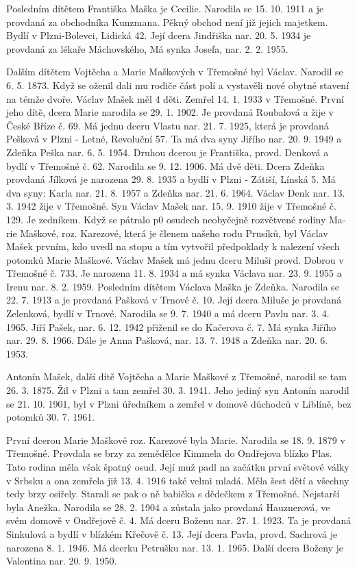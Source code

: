 \documentclass[../dejiny-rodu-prusiku.tex]{subfiles}
\begin{document}
Posledním dítětem Františka Maška je Cecilie. Narodila se 15. 10. 1911 a je provdaná za obchodníka Kunzmana. Pěkný obchod není již jejich majetkem. Bydlí v Plzni-Bolevci, Lidická 42. Její dcera Jindřiška nar. 20. 5. 1934 je provdaná za lékaře Máchovského, Má synka Josefa, nar. 2. 2. 1955.

Dalším dítětem Vojtěcha a Marie Maškových v Třemošné byl Václav. Narodil se 6. 5.  1873. Když se oženil dali mu rodiče část polí a vystavěli nové obytné stavení na témže dvoře. Václav Mašek měl 4 děti. Zemřel 14. 1. 1933 v Třemošné. První jeho dítě, dcera Marie narodila se 29. 1. 1902. Je provdaná Roubalová a žije v České Bříze  č. 69. Má jednu dceru Vlastu nar. 21. 7. 1925, která je provdaná Pešková v Plzni - Letné, Revoluční 57. Ta má dva syny Jiřího nar. 20. 9. 1949 a Zdeňka Peška nar. 6. 5. 1954. Druhou dcerou je Františka, provd. Denková a bydlí v Třemošné č. 62. Narodila se 9. 12. 1906. Má dvě děti. Dcera Zdeňka provdaná Jílková je narozena 29. 8. 1935 a bydlí v Plzni - Zátiší, Línská 5. Má dva syny: Karla nar. 21. 8. 1957 a Zdeňka nar. 21. 6. 1964. Václav Denk nar. 13. 3. 1942 žije v Třemošné.  Syn Václav Mašek nar. 15. 9. 1910 žije v Třemošné č. 129. Je zedníkem. Když se pátralo p0 osudech neobyčejně rozvětvené rodiny Ma­rie Maškové, roz. Karezové, která je členem našeho rodu Prusíků, byl Václav Mašek prvním, kdo uvedl na stopu a tím vytvořil předpoklady k nalezení všech potomků Ma­rie Maškové. Václav Mašek má jednu dceru Miluši provd. Dobrou v Třemošné č. 733. Je narozena 11. 8. 1934 a má synka Václava nar. 23. 9. 1955 a Irenu nar. 8. 2. 1959. Posledním dítětem Václava Maška je Zdeňka. Narodila se 22. 7. 1913 a je provdaná Pašková v Trnové č. 10. Její dcera Miluše je provdaná Zelenková, bydlí v Trnové. Narodila se 9. 7. 1940 a má dceru Pavlu nar. 3. 4. 1965. Jiří Pašek, nar. 6. 12. 1942 přiženil se do Kačerova č. 7. Má synka Ji­řího nar. 29. 8. 1966. Dále je Anna Pašková, nar. 13. 7. 1948 a Zdeňka nar. 20. 6. 1953.

Antonín Mašek, další dítě Vojtěcha a Marie Maškové z Třemošné, narodil se tam 26. 3. 1875. Žil v Plzni a tam zemřel 30. 3. 1941. Jeho jediný syn Antonín narodil se 21. 10. 1901, byl v Plzni úředníkem a zemřel v domově dů­chodců v Liblíně, bez potomků 30. 7. 1961.

První dcerou Marie Maškové roz. Karezové byla Marie. Narodila se 18. 9. 1879 v Třemošné. Provdala se brzy za zemědělce Kimmela do Ondřejova blízko Plas. Tato rodina měla však špatný osud. Její muž padl na začátku první světové války v Srbsku a ona zemřela již 13. 4. 1916 také velmi mladá. Měla šest dětí a všechny tedy brzy osiřely. Starali se pak o ně babička s dědečkem z Třemošné. Nejstarší byla Anežka. Narodila se 28. 2. 1904 a zůstala jako provdaná Hauznerová, ve svém domově v Ondřejově č. 4. Má dceru Boženu nar. 27. 1. 1923. Ta je provdaná Sinkulová a bydlí v blízkém Křečově č. 13. Její dcera Pavla, provd. Sachrová je narozena 8. 1. 1946. Má dcerku Petrušku nar. 13. 1. 1965. Další dcera Boženy je Valentina nar. 20. 9. 1950.
\end{document}
